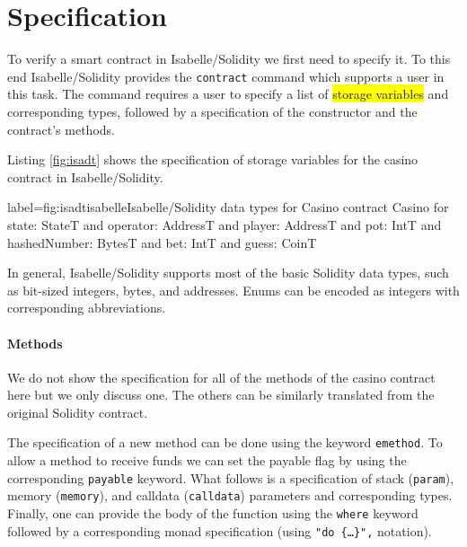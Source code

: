 \documentclass[a4paper,UKenglish,cleveref, autoref, thm-restate]{oasics-v2021}
\begin{document}
\section{Specification}
To verify a smart contract in Isabelle/Solidity we first need to specify it.
To this end Isabelle/Solidity provides the \texttt{\color{isacom}contract} command which supports a user in this task.
The command requires a user to specify a list of \colorbox{yellow}{storage variables} and corresponding types, followed by a specification of the constructor and the contract's methods.


Listing \ref{fig:isadt} shows the specification of storage variables for the casino contract in Isabelle/Solidity.
\enlargethispage{.2cm}\vspace{.1cm}
\begin{code}{label={fig:isadt}}{isabelle}{Isabelle/Solidity data types for Casino%
  \hfill{}%
}
contract Casino
  for state: StateT
  and operator: AddressT
  and player: AddressT
  and pot: IntT
  and hashedNumber: BytesT
  and bet: IntT
  and guess: CoinT
\end{code}
In general, Isabelle/Solidity supports most of the basic Solidity data types, such as bit-sized integers, bytes, and addresses.
Enums can be encoded as integers with corresponding abbreviations.
%
\paragraph*{Methods}
We do not show the specification for all of the methods of the casino contract here but we only discuss one.
The others can be similarly translated from the original Solidity contract.

The specification of a new method can be done using the keyword \texttt{\color{isargreen}emethod}.
To allow a method to receive funds we can set the payable flag by using the corresponding \texttt{\color{isargreen}payable} keyword.
What follows is a specification of stack (\texttt{\color{isargreen}param}), memory (\texttt{\color{isargreen}memory}), and calldata (\texttt{\color{isargreen}calldata}) parameters and corresponding types.
Finally, one can provide the body of the function using the \texttt{\color{isargreen}where} keyword followed by a corresponding monad specification (using \texttt{"\texttt{\color{isarlight}do} \{\dots\}",} notation).
\end{document}
